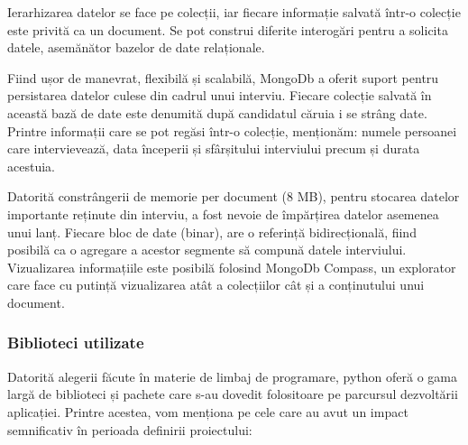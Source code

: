 \documentclass[a4paper, 12pt]{report}
\begin{document}
	Ierarhizarea datelor se face pe colecții, iar fiecare informație salvată într-o colecție este privită ca un document. Se pot construi diferite interogări pentru a solicita datele, asemănător bazelor de date relaționale.
	
	Fiind ușor de manevrat, flexibilă și scalabilă, MongoDb a oferit suport pentru persistarea datelor culese din cadrul unui interviu. Fiecare colecție salvată în această bază de date este denumită după candidatul căruia i se strâng date. Printre informații care se pot regăsi într-o colecție, menționăm: numele persoanei care intervievează, data începerii și sfârșitului interviului precum și durata acestuia. 
	
	Datorită constrângerii de memorie per document (8 MB), pentru stocarea datelor importante reținute din interviu, a fost nevoie de împărțirea datelor asemenea unui lanț. Fiecare bloc de date (binar), are o referință bidirecțională, fiind posibilă ca o agregare a acestor segmente să compună datele interviului. Vizualizarea informațiile este posibilă folosind MongoDb Compass, un explorator care face cu putință vizualizarea atât a colecțiilor cât și a conținutului unui document.
	
	\subsubsection{Biblioteci utilizate}
	Datorită alegerii făcute în materie de limbaj de programare, python oferă o gama largă de biblioteci și pachete care s-au dovedit folositoare pe parcursul dezvoltării aplicației. Printre acestea, vom menționa pe cele care au avut un impact semnificativ în perioada definirii proiectului: 
	
\end{document}
